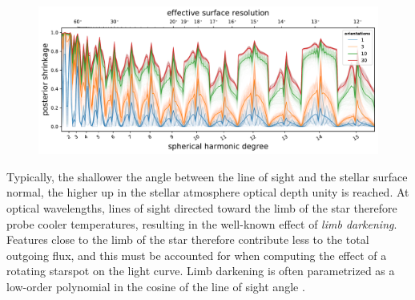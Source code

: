 \documentclass[modern]{aastex62}
\begin{document}
\begin{figure}[t!]
    \begin{centering}
        \includegraphics[width=\linewidth]{figures/nullspace_ensemble_ld.pdf}
    \end{centering}
\end{figure}

Typically, the shallower the angle between the line of sight
and the stellar surface normal, the higher up in the stellar
atmosphere optical depth unity is reached. At optical wavelengths,
lines of sight directed toward the limb of the star therefore
probe cooler temperatures, resulting in the well-known effect of
\emph{limb darkening}. Features close to the limb of the star therefore
contribute less to the total outgoing flux, and this must be
accounted for when computing the effect of a rotating starspot
on the light curve. Limb darkening is often parametrized
as a low-order polynomial in the cosine of the line of sight angle
\citep{Kopal1950}.
\end{document}
